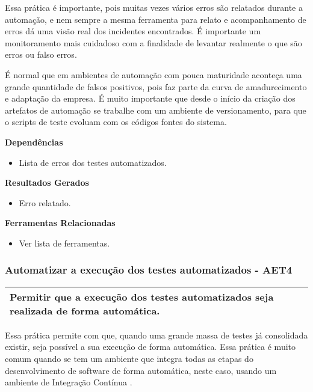 Essa prática é importante, pois muitas vezes vários erros são relatados durante a automação, e nem sempre a mesma ferramenta para relato e acompanhamento de erros dá uma visão real dos incidentes encontrados. É importante um monitoramento mais cuidadoso com a finalidade de levantar realmente o que são erros ou falso erros.

É normal que em ambientes de automação com pouca maturidade aconteça uma grande quantidade de falsos positivos, pois faz parte da curva de amadurecimento e adaptação da empresa. É muito importante que desde o início da criação dos artefatos de automação se trabalhe com um ambiente de versionamento, para que o scripts de teste evoluam com os códigos fontes do sistema.

\textbf{Dependências}
\begin{itemize}
    \item Lista de erros dos testes automatizados.
\end{itemize}

\textbf{ Resultados Gerados}
\begin{itemize}
    \item Erro relatado.
\end{itemize}

\textbf{Ferramentas Relacionadas}
\begin{itemize}
    \item Ver lista de ferramentas.
\end{itemize}

\subsubsection{Automatizar a execução dos testes automatizados - AET4}
\label{sec:aet4}

\begin{table}[!ht]
\centering
\begin{tabular}{|p{130mm}|}
\hline
Permitir que a execução dos testes automatizados seja realizada de forma automática. \\ 
\hline
\end{tabular}
\end{table}

Essa prática permite com que, quando uma grande massa de testes já consolidada existir, seja possível a sua execução de forma automática. Essa prática é muito comum quando se tem um ambiente que integra todas as etapas do desenvolvimento de software de forma automática, neste caso, usando um ambiente de Integração Contínua \cite{BRAGA2015}.

